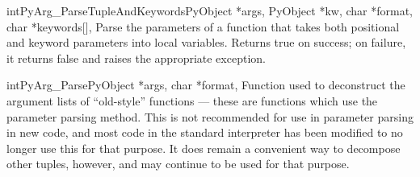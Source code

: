 \begin{cfuncdesc}{int}{PyArg_ParseTupleAndKeywords}{PyObject *args,
                       PyObject *kw, char *format, char *keywords[],
                       \moreargs}
  Parse the parameters of a function that takes both positional and
  keyword parameters into local variables.  Returns true on success;
  on failure, it returns false and raises the appropriate exception.
\end{cfuncdesc}

\begin{cfuncdesc}{int}{PyArg_Parse}{PyObject *args, char *format,
                                    \moreargs}
  Function used to deconstruct the argument lists of ``old-style''
  functions --- these are functions which use the
   parameter parsing method.  This is not
  recommended for use in parameter parsing in new code, and most code
  in the standard interpreter has been modified to no longer use this
  for that purpose.  It does remain a convenient way to decompose
  other tuples, however, and may continue to be used for that
  purpose.
\end{cfuncdesc}

